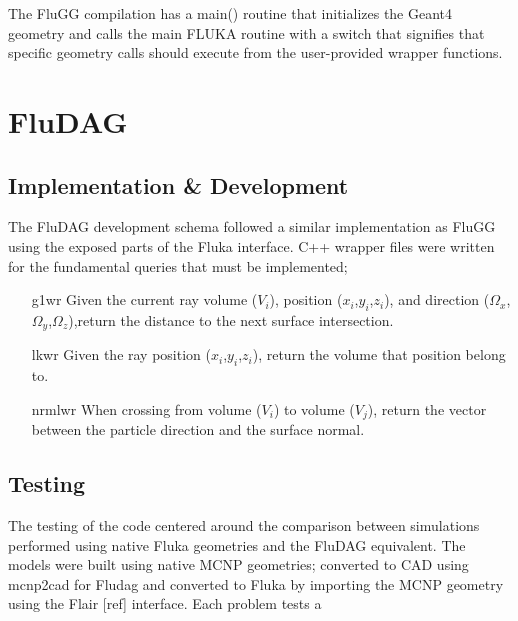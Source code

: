 \documentclass{anstrans}
\begin{document}
The FluGG compilation has a main() routine that initializes the Geant4 geometry and calls the main FLUKA routine with a switch that signifies that specific geometry calls should execute from the user-provided wrapper functions.
\section{FluDAG}
\subsection{Implementation \& Development}
The FluDAG development schema followed a similar implementation as FluGG using the exposed parts of the Fluka interface. C++ wrapper files were written for the fundamental queries that must be implemented;
\begin{itemize}
\item[g1wr]{Given the current ray volume ($V_i$), position ($x_i$,$y_i$,$z_i$), and direction ($\Omega_x$,$\Omega_y$,$\Omega_z$),return the distance to the next surface intersection.}
\item[lkwr]{Given the ray position ($x_i$,$y_i$,$z_i$), return the volume that position belong to.}	
\item[nrmlwr]{When crossing from volume ($V_i$) to volume ($V_j$), return
the vector between the particle direction and the surface normal.}
\end{itemize}
\subsection{Testing}
The testing of the code centered around the comparison between simulations performed using native Fluka geometries and the FluDAG equivalent. The models were built using native MCNP geometries; converted to CAD using mcnp2cad for Fludag and converted to Fluka by importing the MCNP geometry using the Flair [ref] interface. Each problem tests a 
\end{document}
